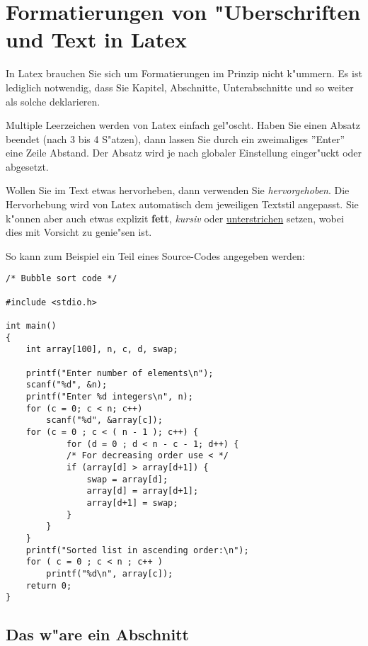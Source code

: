 \chapter[Formatierungen]{Formatierungen von "Uberschriften und Text in Latex}

In Latex brauchen Sie sich um Formatierungen im Prinzip nicht k"ummern. Es ist lediglich notwendig, dass Sie Kapitel, Abschnitte, Unterabschnitte und so weiter als solche deklarieren.

Multiple Leerzeichen        werden von Latex einfach gel"oscht. Haben Sie einen Absatz beendet (nach 3 bis 4 S"atzen), dann lassen Sie durch ein zweimaliges ''Enter'' eine Zeile Abstand. Der Absatz wird je nach globaler Einstellung einger"uckt oder abgesetzt.

Wollen Sie im Text etwas hervorheben, dann verwenden Sie \emph{hervorgehoben}. Die Hervorhebung wird von Latex automatisch dem jeweiligen Textstil angepasst. Sie k"onnen aber auch etwas explizit \textbf{fett}, \textit{kursiv} oder \underline{unterstrichen} setzen, wobei dies mit Vorsicht zu genie"sen ist.

So kann zum Beispiel ein Teil eines Source-Codes angegeben werden: 
\lstset{language=c++}
\begin{lstlisting}
/* Bubble sort code */
 
#include <stdio.h>
 
int main()
{
	int array[100], n, c, d, swap;
 
	printf("Enter number of elements\n");
	scanf("%d", &n);
 	printf("Enter %d integers\n", n);
 	for (c = 0; c < n; c++)
		scanf("%d", &array[c]); 
	for (c = 0 ; c < ( n - 1 ); c++) {
    		for (d = 0 ; d < n - c - 1; d++) {
			/* For decreasing order use < */
			if (array[d] > array[d+1]) {
				swap = array[d];
				array[d] = array[d+1];
				array[d+1] = swap;
			}
		}
	} 
	printf("Sorted list in ascending order:\n");
	for ( c = 0 ; c < n ; c++ )
		printf("%d\n", array[c]);
	return 0;
}
\end{lstlisting}

\section[Abschnitt]{Das w"are ein Abschnitt}

